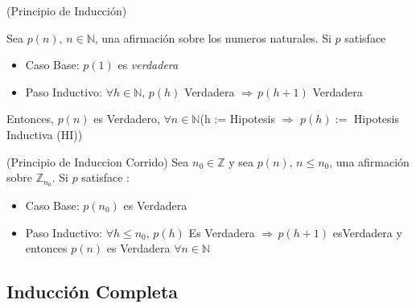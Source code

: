\documentclass[10pt]{article}
\begin{document}
\begin{teo}(Principio de Inducción)

Sea $p(n), \, n \in \mathbb{N}$, una afirmación sobre los numeros naturales. Si $p$ satisface
\begin{itemize}
	\item Caso Base: $p(1)$ es \textit{verdadera}
	\item Paso Inductivo: $\forall h \in \mathbb{N}, \, p(h)$ Verdadera $\Rightarrow \, p(h+1)$ Verdadera
\end{itemize}
Entonces, $p(n)$ es Verdadero, $\forall n \in \mathbb{N}$(h := Hipotesis $\Rightarrow$ $p(h) :=$ Hipotesis Inductiva (HI)) 
\end{teo}

\begin{teo}(Principio de Induccion Corrido)
Sea $n_0 \in \mathbb{Z}$ y sea $p(n), \, n \leq n_0$, una afirmación sobre $\mathbb{Z}_{n_0}$. Si $p$ satisface :
\begin{itemize}
	\item Caso Base: $p(n_0)$ es Verdadera
	\item Paso Inductivo: $\forall h \leq n_0$, $p(h)$ Es Verdadera $\Rightarrow \, p(h+1)$ esVerdadera y entonces $p(n)$ es Verdadera $\forall n \in \mathbb{N}$
\end{itemize}
\end{teo}

\begin{center}
 \subsection{Inducción Completa}
\end{center}
\end{document}
